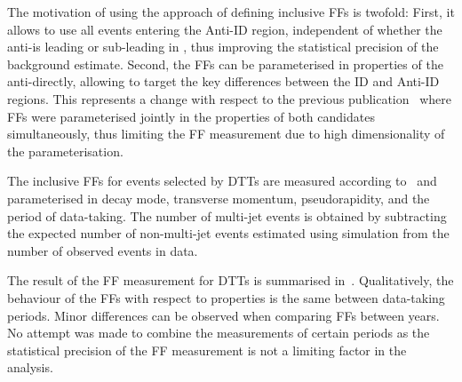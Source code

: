 {  %


  The motivation of using the approach of defining inclusive FFs is twofold:
  First, it allows to use all events entering the Anti-ID region, independent of
  whether the anti-\tauhadvis is leading or sub-leading in \pT, thus improving
  the statistical precision of the background estimate. Second, the FFs can be
  parameterised in properties of the anti-\tauhadvis directly, allowing to
  target the key differences between the ID and Anti-ID regions. This represents
  a change with respect to the previous
  publication~\cite{HIGG-2016-16-witherratum} where FFs were parameterised
  jointly in the properties of both \tauhadvis candidates simultaneously, thus
  limiting %
  the FF measurement due to high dimensionality of the parameterisation.}

The inclusive FFs for events selected by DTTs are measured according
to~ and parameterised in \tauhadvis decay mode,
transverse momentum, pseudorapidity, and the period of data-taking. The number
of multi-jet events is obtained by subtracting the expected number of
non-multi-jet events estimated using simulation from the number of observed
events in data.

The result of the FF measurement for DTTs is summarised
in~. Qualitatively, the behaviour of the FFs with
respect to \tauhadvis properties is the same between data-taking periods. Minor
differences can be observed when comparing FFs between years. No attempt was
made to combine the measurements of certain periods as the statistical precision
of the FF measurement is not a limiting factor in the analysis.


